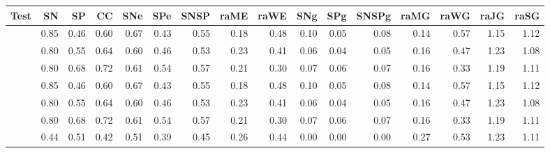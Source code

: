 \begin{tabular}{|c*{15}{|r}|}\hline
Test&SN&SP&CC&SNe&SPe&SNSP&raME&raWE&SNg&SPg&SNSPg&raMG&raWG&raJG&raSG\\\hline
\hline
\parbox[c][6ex][c]{7cm}{\centering{}}
 & 0.85 & 0.46 & 0.60 & 0.67 & 0.43 & 0.55 & 0.18 & 0.48 & 0.10 & 0.05 & 0.08 & 0.14 & 0.57 & 1.15 & 1.12\\[2ex]
\parbox[c][6ex][c]{7cm}{\centering{}}
 & 0.80 & 0.55 & 0.64 & 0.60 & 0.46 & 0.53 & 0.23 & 0.41 & 0.06 & 0.04 & 0.05 & 0.16 & 0.47 & 1.23 & 1.08\\[2ex]
\parbox[c][6ex][c]{7cm}{\centering{}}
 & 0.80 & 0.68 & 0.72 & 0.61 & 0.54 & 0.57 & 0.21 & 0.30 & 0.07 & 0.06 & 0.07 & 0.16 & 0.33 & 1.19 & 1.11\\[2ex]
\hline
\parbox[c][6ex][c]{7cm}{\centering{}}
 & 0.85 & 0.46 & 0.60 & 0.67 & 0.43 & 0.55 & 0.18 & 0.48 & 0.10 & 0.05 & 0.08 & 0.14 & 0.57 & 1.15 & 1.12\\[2ex]
\parbox[c][6ex][c]{7cm}{\centering{}}
 & 0.80 & 0.55 & 0.64 & 0.60 & 0.46 & 0.53 & 0.23 & 0.41 & 0.06 & 0.04 & 0.05 & 0.16 & 0.47 & 1.23 & 1.08\\[2ex]
\parbox[c][6ex][c]{7cm}{\centering{}}
 & 0.80 & 0.68 & 0.72 & 0.61 & 0.54 & 0.57 & 0.21 & 0.30 & 0.07 & 0.06 & 0.07 & 0.16 & 0.33 & 1.19 & 1.11\\[2ex]
\hline
\parbox[c][6ex][c]{7cm}{\centering{}}
 & 0.44 & 0.51 & 0.42 & 0.51 & 0.39 & 0.45 & 0.26 & 0.44 & 0.00 & 0.00 & 0.00 & 0.27 & 0.53 & 1.23 & 1.11\\[2ex]

\end{tabular}
